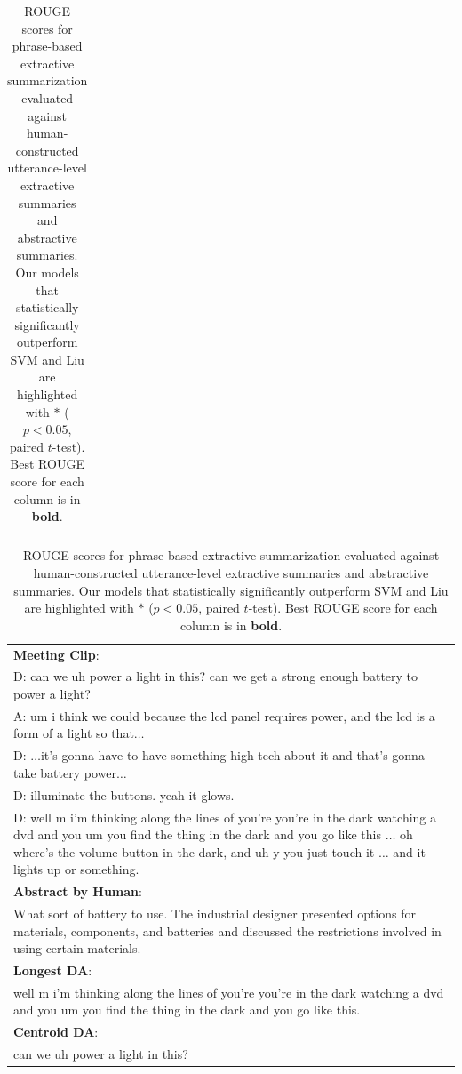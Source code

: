 \begin{table}[ht]
{\begin{tabular}{|l|l|l|l|l|l|l|l|}
    \hline
\end{tabular}
\caption{\fontsize{10}{12}\selectfont ROUGE scores for phrase-based extractive summarization evaluated against human-constructed utterance-level extractive summaries and abstractive summaries. Our models that statistically significantly outperform SVM and Liu \cite{liu2009unsupervised} are highlighted with $\ast$ ($p < 0.05$, paired $t$-test). Best ROUGE score for each column is in \textbf{bold}.}
\label{tab:summ}
}
\hfill
\parbox{.50\linewidth}{
\centering
	{\fontsize{8}{9}\selectfont
    \setlength{\tabcolsep}{0.6mm}
    \begin{tabular}{|p{75mm}|}
    \hline
	
	\textbf{Meeting Clip}: \\
	D: can we uh power a light in this? can we get a strong enough battery to power a light? \\
	A: um i think we could because the lcd panel requires power, and the lcd is a form of a light so that$\ldots$\\
	D: $\ldots$it's gonna have to have something high-tech about it and that's gonna take battery power$\ldots$ \\
	D: illuminate the buttons. yeah it glows.\\
	D: well m i'm thinking along the lines of you're you're in the dark watching a dvd and you um you find the thing in the dark and you go like this $\ldots$ oh where's the volume button in the dark, and uh y you just touch it $\ldots$ and it lights up or something.\\

	\hline \hline    
    
	\textbf{Abstract by Human}: \\
    What sort of battery to use. The industrial designer presented options for materials, components, and batteries and discussed the restrictions involved in using certain materials.\\
	
	\hline \hline
	
	\textbf{Longest DA}: \\
	well m i'm thinking along the lines of you're you're in the dark watching a dvd and you um you find the thing in the dark and you go like this.\\
	\textbf{Centroid DA}: \\
	can we uh power a light in this?\\


\end{tabular}}}
\end{table}
